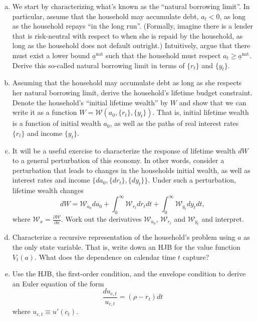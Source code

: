 \documentclass[11pt]{extarticle}
\theoremstyle{plain}
\theoremstyle{definition}
\begin{document}
\begin{enumerate}[(a)]
\item We start by characterizing what's known as the ``natural borrowing limit''. In particular, assume that the household may accumulate debt, $a_t < 0$, as long as the household repays ``in the long run''. (Formally, imagine there is a lender that is risk-neutral with respect to when she is repaid by the household, as long as the household does not default outright.) Intuitively, argue that there must exist a lower bound $\underline a^\text{nat}$ such that the household must respect $a_t \geq \underline a^\text{nat}$. Derive this so-called natural borrowing limit in terms of $\{r_t\}$ and $\{y_t\}$.  


\item Assuming that the household may accumulate debt as long as she respects her natural borrowing limit, derive the household's lifetime budget constraint. Denote the household's ``initial lifetime wealth'' by $W$ and show that we can write it as a function $W = \mathcal W(a_0, \{r_t\}, \{y_t\})$. That is, initial lifetime wealth is a function of initial wealth $a_0$, as well as the paths of real interest rates $\{r_t\}$ and income $\{y_t\}$. 


\item It will be a useful exercise to characterize the response of lifetime wealth $dW$ to a general perturbation of this economy. In other words, consider a perturbation that leads to changes in the households initial wealth, as well as interest rates and income $\{da_0, \{d r_t\}, \{d y_t\}\}$. Under such a perturbation, lifetime wealth changes 
\begin{equation*}
	dW = \mathcal W_{a_0} da_0 + \int_0^\infty \mathcal W_{r_t} d r_t dt + \int_0^\infty \mathcal W_{y_t} d y_t dt, 
\end{equation*}
where $\mathcal W_x = \frac{\partial \mathcal W}{\partial x}$. Work out the derivatives $\mathcal W_{a_0}$, $\mathcal W_{r_t}$ and $\mathcal W_{y_t}$ and interpret.


\item Characterize a recursive representation of the household's problem using $a$ as the only state variable. That is, write down an HJB for the value function $V_t(a)$. What does the dependence on calendar time $t$ capture?


\item Use the HJB, the first-order condition, and the envelope condition to derive an Euler equation of the form  
\begin{equation*}
	\frac{du_{c, t}}{u_{c, t}} =  (\rho - r_t) dt 
\end{equation*}
where $u_{c, t} \equiv u'(c_t)$. 



\end{enumerate}
\end{document}
